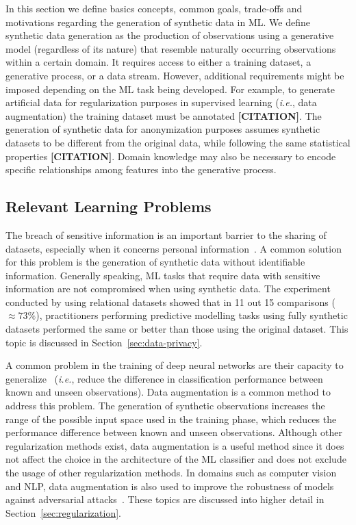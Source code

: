 \documentclass[parskip=full]{scrartcl}
\begin{document}
In this section we define basics concepts, common goals, trade-offs and
motivations regarding the generation of synthetic data in ML\@. We define
synthetic data generation as the production of observations using a generative
model (regardless of its nature) that resemble naturally occurring
observations within a certain domain. It requires access to either a training
dataset, a generative process, or a data stream. However, additional
requirements might be imposed depending on the ML task being developed. For
example, to generate artificial data for regularization purposes in supervised
learning (\textit{i.e.}, data augmentation) the training dataset must be
annotated \textbf{[CITATION]}. The generation of synthetic data for
anonymization purposes assumes synthetic datasets to be different from the
original data, while following the same statistical properties
\textbf{[CITATION]}. Domain knowledge may also be necessary to encode specific
relationships among features into the generative process.


\subsection{Relevant Learning Problems}

The breach of sensitive information is an important barrier to the sharing of
datasets, especially when it concerns personal
information~\cite{dankar2021fake}. A common solution for this problem is the
generation of synthetic data without identifiable information. Generally
speaking, ML tasks that require data with sensitive information are not
compromised when using synthetic data. The experiment conducted by
\citet{patki2016synthetic} using relational datasets showed that in 11 out 15
comparisons ($\approx 73\%$), practitioners performing predictive modelling
tasks using fully synthetic datasets performed the same or better than those
using the original dataset. This topic is discussed in
Section~\ref{sec:data-privacy}.

A common problem in the training of deep neural networks are their capacity to
generalize~\cite{Zhang2021} (\textit{i.e.}, reduce the difference in
classification performance between known and unseen observations). Data
augmentation is a common method to address this problem. The generation of
synthetic observations increases the range of the possible input space used in
the training phase, which reduces the performance difference between known and
unseen observations. Although other regularization methods exist, data
augmentation is a useful method since it does not affect the choice in the
architecture of the ML classifier and does not exclude the usage of other
regularization methods. In domains such as computer vision and NLP, data
augmentation is also used to improve the robustness of models against
adversarial attacks~\cite{zeng2020data, morris2020textattack}. These topics
are discussed into higher detail in Section~\ref{sec:regularization}.
\end{document}

